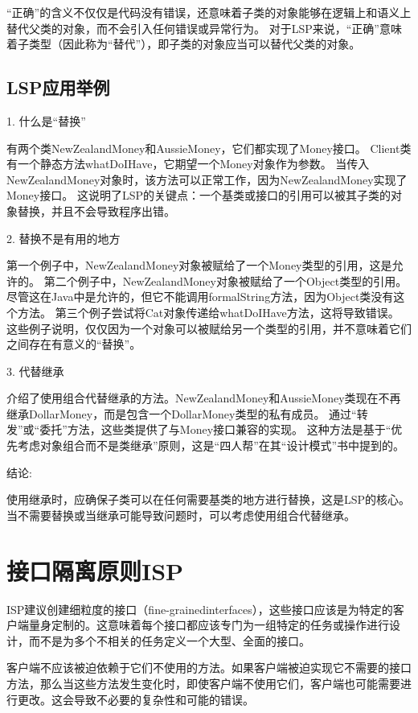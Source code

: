 “正确”的含义不仅仅是代码没有错误，还意味着子类的对象能够在逻辑上和语义上替代父类的对象，而不会引入任何错误或异常行为。
对于LSP来说，“正确”意味着子类型（因此称为“替代”），即子类的对象应当可以替代父类的对象。

\subsection{LSP应用举例}

1. 什么是“替换”

有两个类NewZealandMoney和AussieMoney，它们都实现了Money接口。
Client类有一个静态方法whatDoIHave，它期望一个Money对象作为参数。
当传入NewZealandMoney对象时，该方法可以正常工作，因为NewZealandMoney实现了Money接口。
这说明了LSP的关键点：一个基类或接口的引用可以被其子类的对象替换，并且不会导致程序出错。

2. 替换不是有用的地方

第一个例子中，NewZealandMoney对象被赋给了一个Money类型的引用，这是允许的。
第二个例子中，NewZealandMoney对象被赋给了一个Object类型的引用。尽管这在Java中是允许的，但它不能调用formalString方法，因为Object类没有这个方法。
第三个例子尝试将Cat对象传递给whatDoIHave方法，这将导致错误。
这些例子说明，仅仅因为一个对象可以被赋给另一个类型的引用，并不意味着它们之间存在有意义的“替换”。

3. 代替继承

介绍了使用组合代替继承的方法。NewZealandMoney和AussieMoney类现在不再继承DollarMoney，而是包含一个DollarMoney类型的私有成员。
通过“转发”或“委托”方法，这些类提供了与Money接口兼容的实现。
这种方法是基于“优先考虑对象组合而不是类继承”原则，这是“四人帮”在其“设计模式”书中提到的。

结论:

使用继承时，应确保子类可以在任何需要基类的地方进行替换，这是LSP的核心。
当不需要替换或当继承可能导致问题时，可以考虑使用组合代替继承。


\section{接口隔离原则ISP}
ISP建议创建细粒度的接口（fine-grainedinterfaces），这些接口应该是为特定的客户端量身定制的。这意味着每个接口都应该专门为一组特定的任务或操作进行设计，而不是为多个不相关的任务定义一个大型、全面的接口。

客户端不应该被迫依赖于它们不使用的方法。如果客户端被迫实现它不需要的接口方法，那么当这些方法发生变化时，即使客户端不使用它们，客户端也可能需要进行更改。这会导致不必要的复杂性和可能的错误。

